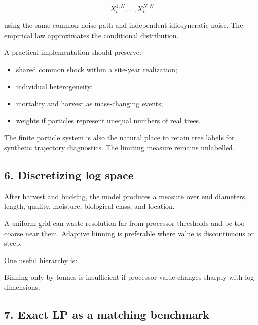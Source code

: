 \[
X_t^{1,N},\ldots,X_t^{N,N}
\]

using the same common-noise path and independent idiosyncratic noise. The
empirical law approximates the conditional distribution.

A practical implementation should preserve:

\begin{itemize}
\tightlist
\item
  shared common shock within a site-year realization;
\item
  individual heterogeneity;
\item
  mortality and harvest as mass-changing events;
\item
  weights if particles represent unequal numbers of real trees.
\end{itemize}

The finite particle system is also the natural place to retain tree labels for
synthetic trajectory diagnostics. The limiting measure remains unlabelled.

\subsection{6. Discretizing log space}\label{discretizing-log-space}

After harvest and bucking, the model produces a measure over end diameters,
length, quality, moisture, biological class, and location.

A uniform grid can waste resolution far from processor thresholds and be too
coarse near them. Adaptive binning is preferable where value is discontinuous or
steep.

One useful hierarchy is:

\begin{Shaded}
\begin{Highlighting}[]
\end{Highlighting}
\end{Shaded}

Binning only by tonnes is insufficient if processor value changes sharply with
log dimensions.

\subsection{7. Exact LP as a matching benchmark}\label{exact-lp-as-a-matching-benchmark}

